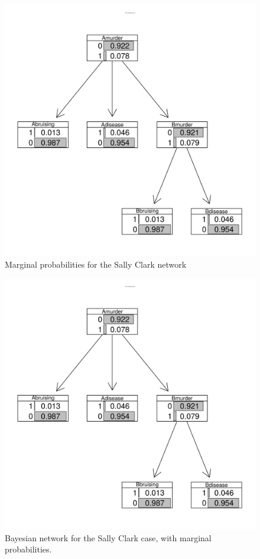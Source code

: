 \documentclass[10pt,]{scrartcl}
\begin{document}
\begin{figure}[H]
    \centering
    \includegraphics{SCBN.png}
    \caption{Marginal probabilities for the Sally Clark network}
    \label{fig:SCBN}
\end{figure}










\begin{figure}[h]
\hspace{10mm}
\includegraphics[width =12cm]{SCBN.png}
\caption{Bayesian network for the Sally Clark case, with marginal probabilities.}
\label{fig:BeatlesBN}
\end{figure}
\end{document}
